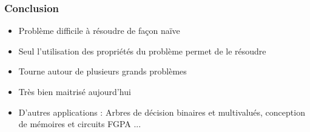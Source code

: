 \documentclass[handout]{beamer}
\begin{document}
\begin{frame}
  \frametitle{Conclusion}
  

  \begin{itemize}
  \item Problème difficile à résoudre de façon naïve
  \item Seul l'utilisation des propriétés du problème permet de le résoudre
  \item Tourne autour de plusieurs grands problèmes
  \item Très bien maitrisé aujourd'hui
  \item D'autres applications : Arbres de décision binaires et multivalués, conception de mémoires et circuits FGPA ...
  \end{itemize}

\end{frame}
\end{document}
